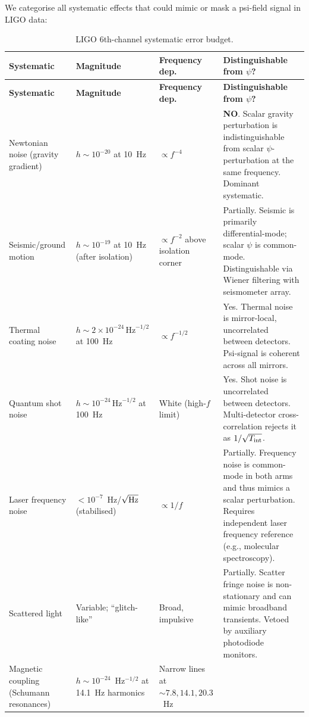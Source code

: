 \documentclass[11pt]{article}
\newcommand{\ee}[1]{\times 10^{#1}}
\theoremstyle{definition}
\theoremstyle{remark}
\begin{document}
We categorise all systematic effects that could mimic or mask a
psi-field signal in LIGO data:

\begin{longtable}{@{}p{3.5cm}p{2.5cm}p{2cm}p{5cm}@{}}
\caption{LIGO 6th-channel systematic error budget.}
\label{tab:ligo_systematics}\\
\toprule
\textbf{Systematic} & \textbf{Magnitude} & \textbf{Frequency dep.} &
  \textbf{Distinguishable from $\psi$?} \\
\midrule
\endfirsthead
\toprule
\textbf{Systematic} & \textbf{Magnitude} & \textbf{Frequency dep.} &
  \textbf{Distinguishable from $\psi$?} \\
\midrule
\endhead
\bottomrule
\endlastfoot
%
Newtonian noise (gravity gradient) &
  $h \sim 10^{-20}$ at 10~Hz &
  $\propto f^{-4}$ &
  \textbf{NO}. Scalar gravity perturbation is indistinguishable from
  scalar $\psi$-perturbation at the same frequency. Dominant systematic.
  \\
\midrule
Seismic/ground motion &
  $h \sim 10^{-19}$ at 10~Hz (after isolation) &
  $\propto f^{-2}$ above isolation corner &
  Partially. Seismic is primarily differential-mode; scalar $\psi$ is
  common-mode. Distinguishable via Wiener filtering with seismometer
  array.
  \\
\midrule
Thermal coating noise &
  $h \sim 2\ee{-24}\,\text{Hz}^{-1/2}$ at 100~Hz &
  $\propto f^{-1/2}$ &
  Yes. Thermal noise is mirror-local, uncorrelated between detectors.
  Psi-signal is coherent across all mirrors.
  \\
\midrule
Quantum shot noise &
  $h \sim 10^{-24}\,\text{Hz}^{-1/2}$ at 100~Hz &
  White (high-$f$ limit) &
  Yes. Shot noise is uncorrelated between detectors. Multi-detector
  cross-correlation rejects it as $1/\sqrt{T_{\rm int}}$.
  \\
\midrule
Laser frequency noise &
  $<10^{-7}$~Hz/$\sqrt{\rm Hz}$ (stabilised) &
  $\propto 1/f$ &
  Partially. Frequency noise is common-mode in both arms and thus mimics
  a scalar perturbation. Requires independent laser frequency reference
  (e.g., molecular spectroscopy).
  \\
\midrule
Scattered light &
  Variable; ``glitch-like'' &
  Broad, impulsive &
  Partially. Scatter fringe noise is non-stationary and can mimic
  broadband transients. Vetoed by auxiliary photodiode monitors.
  \\
\midrule
Magnetic coupling (Schumann resonances) &
  $h \sim 10^{-24}$~Hz$^{-1/2}$ at 14.1~Hz harmonics &
  Narrow lines at $\sim 7.8, 14.1, 20.3$~Hz &

\end{longtable}
\end{document}
